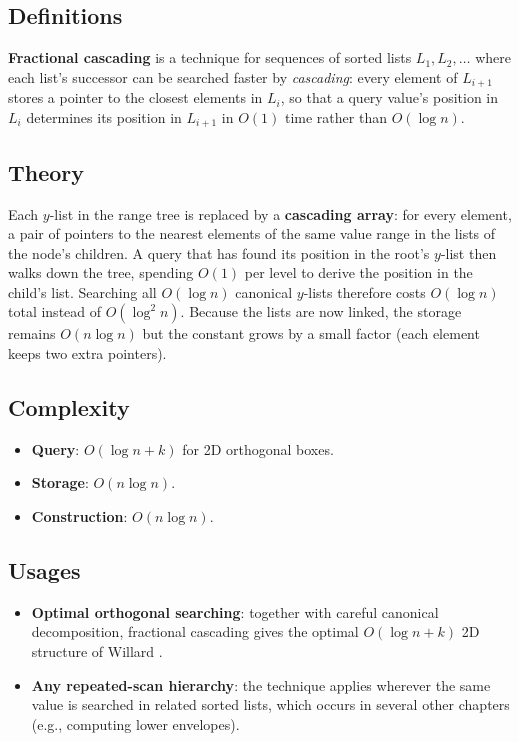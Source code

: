 \subsection{Definitions}

\begin{definition}\label{def:rangesearch_cascading}
  \textbf{Fractional cascading} is a technique for sequences of sorted
  lists $L_1, L_2, \dots$ where each list's successor can be searched
  faster by \emph{cascading}: every element of $L_{i+1}$ stores a pointer
  to the closest elements in $L_i$, so that a query value's position in
  $L_i$ determines its position in $L_{i+1}$ in $O(1)$ time rather than
  $O(\log n)$.
\end{definition}

\subsection{Theory}

Each $y$-list in the range tree is replaced by a \textbf{cascading array}:
for every element, a pair of pointers to the nearest elements of the same
value range in the lists of the node's children. A query that has found
its position in the root's $y$-list then walks down the tree, spending
$O(1)$ per level to derive the position in the child's list. Searching all
$O(\log n)$ canonical $y$-lists therefore costs $O(\log n)$ total instead
of $O(\log^2 n)$. Because the lists are now linked, the storage remains
$O(n \log n)$ but the constant grows by a small factor (each element keeps
two extra pointers).

\subsection{Complexity}

\begin{itemize}
  \item \textbf{Query}: $O(\log n + k)$ for 2D orthogonal boxes.
  \item \textbf{Storage}: $O(n \log n)$.
  \item \textbf{Construction}: $O(n \log n)$.
\end{itemize}

\subsection{Usages}

\begin{itemize}
  \item \textbf{Optimal orthogonal searching}: together with careful
    canonical decomposition, fractional cascading gives the optimal
    $O(\log n + k)$ 2D structure of Willard \cite{willard1985}.
  \item \textbf{Any repeated-scan hierarchy}: the technique applies
    wherever the same value is searched in related sorted lists, which
    occurs in several other chapters (e.g., computing lower envelopes).
\end{itemize}

